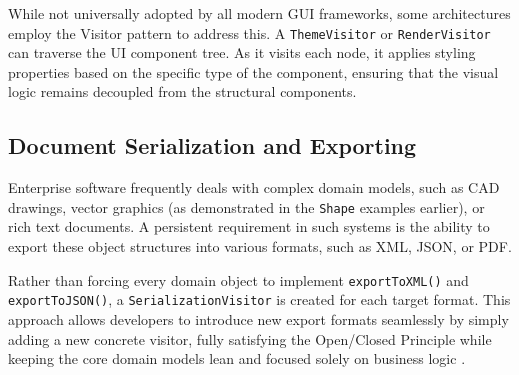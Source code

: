 While not universally adopted by all modern GUI frameworks, some architectures employ the Visitor pattern to address this. A \texttt{Theme\allowbreak Visitor} or \texttt{Render\allowbreak Visitor} can traverse the UI component tree. As it visits each node, it applies styling properties based on the specific type of the component, ensuring that the visual logic remains decoupled from the structural components.

\subsection{Document Serialization and Exporting}
Enterprise software frequently deals with complex domain models, such as CAD drawings, vector graphics (as demonstrated in the \texttt{Shape} examples earlier), or rich text documents. A persistent requirement in such systems is the ability to export these object structures into various formats, such as XML, JSON, or PDF.

Rather than forcing every domain object to implement \texttt{exportTo\allowbreak XML()} and \texttt{exportTo\allowbreak JSON()}, a \texttt{Serialization\allowbreak Visitor} is created for each target format. This approach allows developers to introduce new export formats seamlessly by simply adding a new concrete visitor, fully satisfying the Open/Closed Principle while keeping the core domain models lean and focused solely on business logic \cite{gof1994}.
